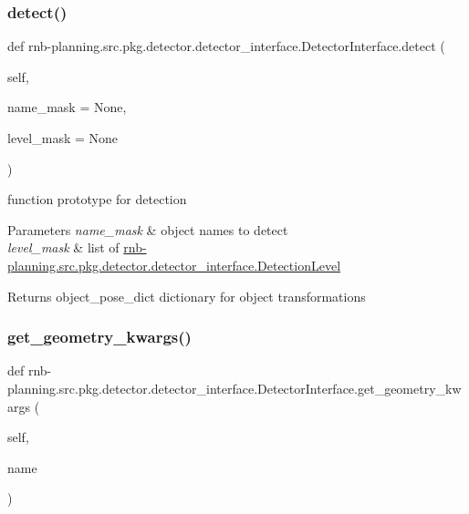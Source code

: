 \subsubsection{\texorpdfstring{detect()}{detect()}}
{\footnotesize\ttfamily def rnb-\/planning.\+src.\+pkg.\+detector.\+detector\+\_\+interface.\+Detector\+Interface.\+detect (\begin{DoxyParamCaption}\item[{}]{self,  }\item[{}]{name\+\_\+mask = {\ttfamily None},  }\item[{}]{level\+\_\+mask = {\ttfamily None} }\end{DoxyParamCaption})}



function prototype for detection 


\begin{DoxyParams}{Parameters}
{\em name\+\_\+mask} & object names to detect \\
\hline
{\em level\+\_\+mask} & list of \hyperlink{classrnb-planning_1_1src_1_1pkg_1_1detector_1_1detector__interface_1_1_detection_level}{rnb-\/planning.\+src.\+pkg.\+detector.\+detector\+\_\+interface.\+Detection\+Level} \\
\hline
\end{DoxyParams}
\begin{DoxyReturn}{Returns}
object\+\_\+pose\+\_\+dict dictionary for object transformations 
\end{DoxyReturn}
\mbox{\label{classrnb-planning_1_1src_1_1pkg_1_1detector_1_1detector__interface_1_1_detector_interface_a3b19e0401a73d9f0a9364efbeeaca638}} 
\subsubsection{\texorpdfstring{get\+\_\+geometry\+\_\+kwargs()}{get\_geometry\_kwargs()}}
{\footnotesize\ttfamily def rnb-\/planning.\+src.\+pkg.\+detector.\+detector\+\_\+interface.\+Detector\+Interface.\+get\+\_\+geometry\+\_\+kwargs (\begin{DoxyParamCaption}\item[{}]{self,  }\item[{}]{name }\end{DoxyParamCaption})}



